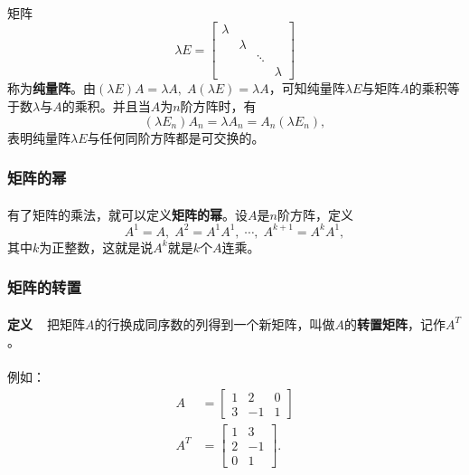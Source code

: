 \paragraph{}
矩阵
\begin{equation*}
  \lambda E = \left[\begin{array}{cccc}
    \lambda & & & \\
    & \lambda & & \\
    & & \ddots & \\
    & & & \lambda
  \end{array}\right]
\end{equation*}
称为\textbf{纯量阵}。由$(\lambda E)A=\lambda A, \; A(\lambda E) = \lambda A$，可知纯量阵$\lambda E$与矩阵$A$的乘积等于数$\lambda$与$A$的乘积。并且当$A$为$n$阶方阵时，有
\begin{equation*}
  (\lambda E_n)A_n = \lambda A_n = A_n(\lambda E_n),
\end{equation*}
表明纯量阵$\lambda E$与任何同阶方阵都是可交换的。

\subsubsection{矩阵的幂}
\paragraph{}
有了矩阵的乘法，就可以定义\textbf{矩阵的幂}。设$A$是$n$阶方阵，定义
\begin{equation*}
  A^1 = A, \; A^2 = A^1A^1, \; \cdots, \;A^{k+1}=A^kA^1,
\end{equation*}
其中$k$为正整数，这就是说$A^k$就是$k$个$A$连乘。

\subsubsection{矩阵的转置}
\paragraph{}
\textbf{定义~~}把矩阵$A$的行换成同序数的列得到一个新矩阵，叫做$A$的\textbf{转置矩阵}，记作$A^T$。

\paragraph{}
例如：
\begin{align*}
  A &= \left[\begin{array}{ccc}
    1 & 2 & 0 \\
    3 & -1 & 1
  \end{array}\right] \\
  A^T &= \left[\begin{array}{cc}
    1 & 3 \\
    2 & -1 \\
    0 & 1
  \end{array}\right].
\end{align*}

